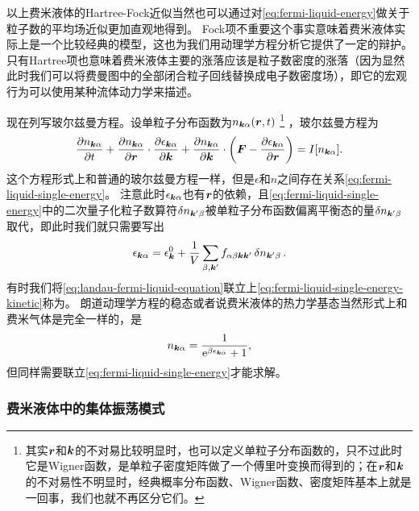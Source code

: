 以上费米液体的Hartree-Fock近似当然也可以通过对\eqref{eq:fermi-liquid-energy}做关于粒子数的平均场近似更加直观地得到。
Fock项不重要这个事实意味着费米液体实际上是一个比较经典的模型，这也为我们用动理学方程分析它提供了一定的辩护。
只有Hartree项也意味着费米液体主要的涨落应该是粒子数密度的涨落（因为显然此时我们可以将费曼图中的全部闭合粒子回线替换成电子数密度场），即它的宏观行为可以使用某种流体动力学来描述。

现在列写玻尔兹曼方程。设单粒子分布函数为$n_{\vb*{k} \alpha}(\vb*{r}, t)$%
\footnote{
    其实$\vb*{r}$和$\vb*{k}$的不对易比较明显时，也可以定义单粒子分布函数的，只不过此时它是Wigner函数，是单粒子密度矩阵做了一个傅里叶变换而得到的；在$\vb*{r}$和$\vb*{k}$的不对易性不明显时，经典概率分布函数、Wigner函数、密度矩阵基本上就是一回事，我们也就不再区分它们。
}%
，玻尔兹曼方程为
\begin{equation}
    \pdv{n_{\vb*{k} \alpha}}{t} + \pdv{n_{\vb*{k} \alpha}}{\vb*{r}} \cdot \pdv{\epsilon_{\vb*{k} \alpha}}{\vb*{k}} + \pdv{n_{\vb*{k} \alpha}}{\vb*{k}} \cdot \left( \vb*{F} - \pdv{\epsilon_{\vb*{k} \alpha}}{\vb*{r}} \right) = I[n_{\vb*{k} \alpha}]. 
    \label{eq:landau-fermi-liquid-equation}
\end{equation}
这个方程形式上和普通的玻尔兹曼方程一样，但是$\epsilon$和$n$之间存在关系\eqref{eq:fermi-liquid-single-energy}。
注意此时$\epsilon_{\vb*{k} \alpha}$也有$\vb*{r}$的依赖，且\eqref{eq:fermi-liquid-single-energy}中的二次量子化粒子数算符$\var{n_{\vb*{k}' \beta}}$被单粒子分布函数偏离平衡态的量$\var{n_{\vb*{k}' \beta}}$取代，即此时我们就只需要写出
\begin{equation}
    \epsilon_{\vb*{k} \alpha} = \epsilon_{\vb*{k}}^0 + \frac{1}{V} \sum_{\beta, \vb*{k}'} f_{\alpha \beta \vb*{k} \vb*{k}'} \var{n_{\vb*{k}' \beta}}.
    \label{eq:fermi-liquid-single-energy-kinetic}
\end{equation}
有时我们将\eqref{eq:landau-fermi-liquid-equation}联立上\eqref{eq:fermi-liquid-single-energy-kinetic}称为。
朗道动理学方程的稳态或者说费米液体的热力学基态当然形式上和费米气体是完全一样的，是
\begin{equation}
    n_{\vb*{k} \alpha} = \frac{1}{\mathrm{e}^{\beta \epsilon_{\vb*{k} \alpha}} + 1},
    \label{eq:fermi-liquid-stable-state}
\end{equation}
但同样需要联立\eqref{eq:fermi-liquid-single-energy}才能求解。

\subsubsection{费米液体中的集体振荡模式}

